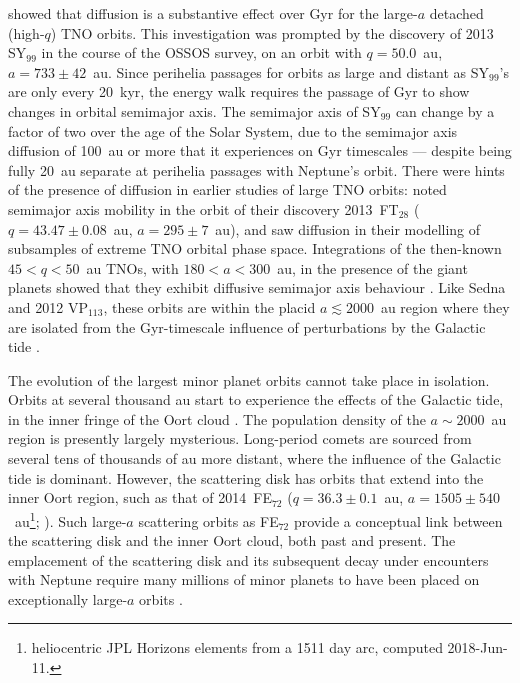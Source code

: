 \documentclass{aastex62}
\begin{document}
\citet{bannister17} showed that diffusion is a substantive effect over Gyr for the large-$a$ detached (high-$q$) TNO orbits.
This investigation was prompted by the discovery of 2013 SY$_{99}$ in the course of the OSSOS survey, on an orbit with $q = 50.0$~au, $a = 733 \pm 42$~au.
Since perihelia passages for orbits as large and distant as SY$_{99}$'s are only every 20~kyr, the energy walk requires the passage of Gyr to show changes in orbital semimajor axis.
The semimajor axis of SY$_{99}$ can change by a factor of two over the age of the Solar System, due to the semimajor axis diffusion of 100~au or more that it experiences on Gyr timescales --- despite being fully 20~au separate at perihelia passages with Neptune's orbit.
There were hints of the presence of diffusion in earlier studies of large TNO orbits: \citet{sheppardtrujillo16} noted semimajor axis mobility in the orbit of their discovery 2013~FT$_{28}$ ($q = 43.47 \pm 0.08$~au, $a = 295 \pm 7$~au), and \citet{gallardo12,brasserschwamb15} saw diffusion in their modelling of subsamples of extreme TNO orbital phase space.
Integrations of the then-known $45<q<50$~au TNOs, with $180 < a < 300$~au, in the presence of the giant planets showed that they exhibit diffusive semimajor axis behaviour \citep{bannister17}. 
Like Sedna and 2012 VP$_{113}$, these orbits are within the placid $a \lesssim 2000$~au region where they are isolated from the Gyr-timescale influence of perturbations by the Galactic tide \citep{brasserschwamb15}.

The evolution of the largest minor planet orbits cannot take place in isolation. 
Orbits at several thousand au start to experience the effects of the Galactic tide, in the inner fringe of the Oort cloud \citep{dones04}.
The population density of the $a \sim 2000$~au region is presently largely mysterious. 
Long-period comets are sourced from several tens of thousands of au more distant, where the influence of the Galactic tide is dominant.
However, the scattering disk has orbits that extend into the inner Oort region, such as that of 2014~FE$_{72}$ ($q = 36.3\pm 0.1$~au, $a=1505\pm 540$~au\footnote{heliocentric JPL Horizons elements from a 1511 day arc, computed 2018-Jun-11.}; \citealt{sheppardtrujillo16}).
Such large-$a$ scattering orbits as FE$_{72}$ provide a conceptual link between the scattering disk and the inner Oort cloud, both past and present.
The emplacement of the scattering disk and its subsequent decay under encounters with Neptune require many millions of minor planets to have been placed on exceptionally large-$a$ orbits \citep{gladman05, levison06}.
\end{document}
